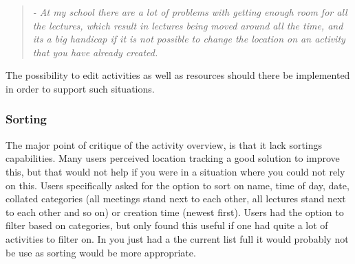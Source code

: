 \begin{quotation}
	\emph{
		- At my school there are a lot of problems with getting enough room for all the lectures, which result in lectures being moved around all the time, and its a big handicap if it is not possible to change the location on an activity that you have already created.
	}
\end{quotation}

The possibility to edit activities as well as resources should there be implemented in order to support such situations.

\subsubsection{Sorting}
The major point of critique of the activity overview, is that it lack sortings capabilities. Many users perceived location tracking a good solution to improve this, but that would not help if you were in a situation where you could not rely on this. Users specifically asked for the option to sort on name, time of day, date, collated categories (all meetings stand next to each other, all lectures stand next to each other and so on) or creation time (newest first). Users had the option to filter based on categories, but only found this useful if one had quite a lot of activities to filter on. In you just had a the current list full it would probably not be use as sorting would be more appropriate.